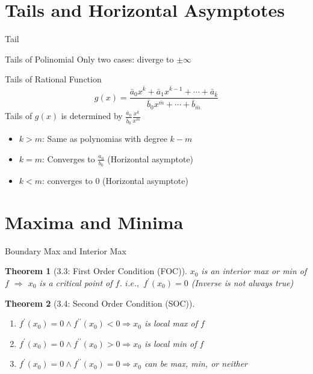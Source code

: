 \documentclass[a4paper,11pt]{article}
\newtheorem{thm}{Theorem}
\begin{document}
\section{Tails and Horizontal Asymptotes} %
\label{sec:tails_and_horizontal_asymptotes}
\begin{frame}[t]{Tail}
	\begin{block}
		{Tails of Polinomial}
		Only two cases: diverge to $\pm\infty$
	\end{block}
	\begin{block}
		{Tails of Rational Function}
		\[
			g(x) = \frac{\bar a_0 x^{\bar k} + \bar a_1 x^{\bar k-1} + \cdots + \bar a_{\bar k}}{\bar b_0 x^{\bar m} + \cdots +\bar b_{\bar m}}
		\]
		Tails of $g(x)$ is determined by $\frac{\bar a_0}{\bar b_0}\frac{x^{\bar k}}{x^{\bar m}}$
		\begin{itemize}
			\item $k>m$: Same as polynomias with degree $k-m$
			\item $k=m$: Converges to $\frac{a_0}{b_0}$ (Horizontal asymptote)
			\item $k<m$: converges to $0$ (Horizontal asymptote)
		\end{itemize}
	\end{block}
\end{frame}

\section{Maxima and Minima} %
\label{sec:maxima_and_minima}
\begin{frame}[t]{Boundary Max and Interior Max}
	\begin{thm}
		[3.3: First Order Condition (FOC)]
		$x_0$ is an interior max or min of $f$ $\Rightarrow$ $x_0$ is a critical point of $f$. $i.e.,$ $f^\prime(x_0)=0$
		(Inverse is not always true)
	\end{thm}
	
	\begin{thm}
		[3.4: Second Order Condition (SOC)]
		\begin{enumerate}
			\item $f^\prime(x_0)=0 \land f^{\prime\prime}(x_0)<0 \Rightarrow x_0$ is local max of $f$
			\item $f^\prime(x_0)=0 \land f^{\prime\prime}(x_0)>0 \Rightarrow x_0$ is local min of $f$
			\item $f^\prime(x_0)=0 \land f^{\prime\prime}(x_0)=0 \Rightarrow x_0$ can be max, min, or neither
		\end{enumerate}
	\end{thm}
\end{frame}
\end{document}
